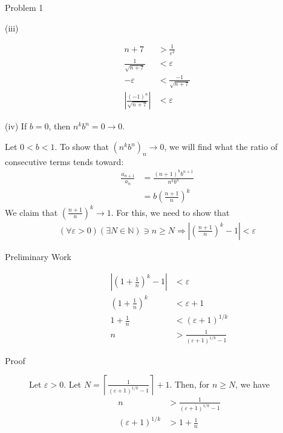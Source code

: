 \documentclass[10pt]{extarticle}
\newcommand{\N}{\mathbb{N}}
\begin{document}
\begin{problem}{Problem 1}
\begin{problem}{(iii)}
\begin{description}
\begin{align*}
            n + 7 &> \frac{1}{\varepsilon^2}\\
            \frac{1}{\sqrt{n+7}} & < \varepsilon\\
            -\varepsilon &< \frac{-1}{\sqrt{n+7}}\\
            \left|\frac{(-1)^{n}}{\sqrt{n+7}}\right| & < \varepsilon
          \end{align*}
      \end{description}
    \end{problem}
    \begin{problem}{(iv)}
      If $b = 0$, then $n^kb^n = 0 \rightarrow 0$.\newline

      Let $0 < b < 1$. To show that $(n^kb^n)_n \rightarrow 0$, we will find what the ratio of consecutive terms tends toward:
      \begin{align*}
        \frac{a_{n+1}}{a_n} &= \frac{(n+1)^kb^{n+1}}{n^kb^n}\\
                            &= b\left(\frac{n+1}{n}\right)^k
      \end{align*}
      We claim that $\left(\frac{n+1}{n}\right)^k \rightarrow 1$. For this, we need to show that
      \begin{align*}
        (\forall \varepsilon > 0)(\exists N\in\N)\ni n\geq N \Rightarrow \left|\left(\frac{n+1}{n}\right)^k - 1 \right| < \varepsilon
      \end{align*}
      \begin{description}
        \item[Preliminary Work]
          \begin{align*}
            \left|\left(1 + \frac{1}{n}\right)^k - 1 \right| &< \varepsilon\\
            \left(1+\frac{1}{n}\right)^k &< \varepsilon + 1\\
            1 + \frac{1}{n} &< \left(\varepsilon + 1\right)^{1/k}\\
            n &> \frac{1}{\left(\varepsilon + 1\right)^{1/k} -1}
          \end{align*}
        \item[Proof] Let $\varepsilon > 0$. Let $\displaystyle N = \left\lceil \frac{1}{\left(\varepsilon + 1\right)^{1/k}-1}\right\rceil + 1$. Then, for $n\geq N$, we have
          \begin{align*}
            n &> \frac{1}{\left(\varepsilon + 1\right)^{1/k}-1}\\
            (\varepsilon + 1)^{1/k} &> 1 + \frac{1}{n}\\

\end{align*}
\end{description}
\end{problem}
\end{problem}
\end{document}
